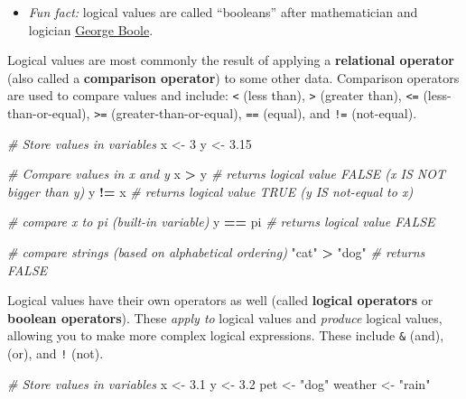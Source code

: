 \documentclass[]{book}
\newenvironment{Shaded}{\begin{snugshade}}{\end{snugshade}}
\newcommand{\DecValTok}[1]{\textcolor[rgb]{0.00,0.00,0.81}{#1}}
\newcommand{\FloatTok}[1]{\textcolor[rgb]{0.00,0.00,0.81}{#1}}
\newcommand{\StringTok}[1]{\textcolor[rgb]{0.31,0.60,0.02}{#1}}
\newcommand{\CommentTok}[1]{\textcolor[rgb]{0.56,0.35,0.01}{\textit{#1}}}
\newcommand{\OperatorTok}[1]{\textcolor[rgb]{0.81,0.36,0.00}{\textbf{#1}}}
\newcommand{\NormalTok}[1]{#1}
\providecommand{\tightlist}{%
  \setlength{\itemsep}{0pt}\setlength{\parskip}{0pt}}
\theoremstyle{definition}
\theoremstyle{definition}
\theoremstyle{remark}
\begin{document}
\begin{itemize}
  \begin{itemize}
  \tightlist
  \item
    \emph{Fun fact:} logical values are called ``booleans'' after
    mathematician and logician
    \href{https://en.wikipedia.org/wiki/George_Boole}{George Boole}.
  \end{itemize}

  Logical values are most commonly the result of applying a
  \textbf{relational operator} (also called a \textbf{comparison
  operator}) to some other data. Comparison operators are used to
  compare values and include: \texttt{\textless{}} (less than),
  \texttt{\textgreater{}} (greater than), \texttt{\textless{}=}
  (less-than-or-equal), \texttt{\textgreater{}=}
  (greater-than-or-equal), \texttt{==} (equal), and \texttt{!=}
  (not-equal).

\begin{Shaded}
\begin{Highlighting}[]
\CommentTok{# Store values in variables}
\NormalTok{x <-}\StringTok{ }\DecValTok{3}
\NormalTok{y <-}\StringTok{ }\FloatTok{3.15}

\CommentTok{# Compare values in x and y}
\NormalTok{x }\OperatorTok{>}\StringTok{ }\NormalTok{y  }\CommentTok{# returns logical value FALSE (x IS NOT bigger than y)}
\NormalTok{y }\OperatorTok{!=}\StringTok{ }\NormalTok{x  }\CommentTok{# returns logical value TRUE (y IS not-equal to x)}

\CommentTok{# compare x to pi (built-in variable)}
\NormalTok{y }\OperatorTok{==}\StringTok{ }\NormalTok{pi  }\CommentTok{# returns logical value FALSE}

\CommentTok{# compare strings (based on alphabetical ordering)}
\StringTok{"cat"} \OperatorTok{>}\StringTok{ "dog"}  \CommentTok{# returns FALSE}
\end{Highlighting}
\end{Shaded}

  Logical values have their own operators as well (called
  \textbf{logical operators} or \textbf{boolean operators}). These
  \emph{apply to} logical values and \emph{produce} logical values,
  allowing you to make more complex logical expressions. These include
  \texttt{\&} (and), \texttt{\textbar{}} (or), and \texttt{!} (not).

\begin{Shaded}
\begin{Highlighting}[]
\CommentTok{# Store values in variables}
\NormalTok{x <-}\StringTok{ }\FloatTok{3.1}
\NormalTok{y <-}\StringTok{ }\FloatTok{3.2}
\NormalTok{pet <-}\StringTok{ "dog"}
\NormalTok{weather <-}\StringTok{ "rain"}


\end{Highlighting}
\end{Shaded}
\end{itemize}
\end{document}

